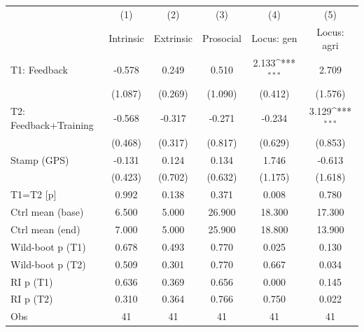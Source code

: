 {
\def\sym#1{\ifmmode^{#1}\else\(^{#1}\)\fi}
\begin{tabular}{l*{5}{c}}
\toprule
                    &\multicolumn{1}{c}{(1)}&\multicolumn{1}{c}{(2)}&\multicolumn{1}{c}{(3)}&\multicolumn{1}{c}{(4)}&\multicolumn{1}{c}{(5)}\\
                    &\multicolumn{1}{c}{Intrinsic}&\multicolumn{1}{c}{Extrinsic}&\multicolumn{1}{c}{Prosocial}&\multicolumn{1}{c}{Locus: gen}&\multicolumn{1}{c}{Locus: agri}\\
\midrule
T1: Feedback        &      -0.578         &       0.249         &       0.510         &       2.133\sym{***}&       2.709         \\
                    &     (1.087)         &     (0.269)         &     (1.090)         &     (0.412)         &     (1.576)         \\
T2: Feedback+Training&      -0.568         &      -0.317         &      -0.271         &      -0.234         &       3.129\sym{***}\\
                    &     (0.468)         &     (0.317)         &     (0.817)         &     (0.629)         &     (0.853)         \\
Stamp (GPS)         &      -0.131         &       0.124         &       0.134         &       1.746         &      -0.613         \\
                    &     (0.423)         &     (0.702)         &     (0.632)         &     (1.175)         &     (1.618)         \\
\midrule
T1=T2 [p]           &       0.992         &       0.138         &       0.371         &       0.008         &       0.780         \\
Ctrl mean (base)    &       6.500         &       5.000         &      26.900         &      18.300         &      17.300         \\
Ctrl mean (end)     &       7.000         &       5.000         &      25.900         &      18.800         &      13.900         \\
Wild-boot p (T1)    &       0.678         &       0.493         &       0.770         &       0.025         &       0.130         \\
Wild-boot p (T2)    &       0.509         &       0.301         &       0.770         &       0.667         &       0.034         \\
RI p (T1)           &       0.636         &       0.369         &       0.656         &       0.000         &       0.145         \\
RI p (T2)           &       0.310         &       0.364         &       0.766         &       0.750         &       0.022         \\
Obs                 &          41         &          41         &          41         &          41         &          41         \\
\bottomrule
\end{tabular}
}
